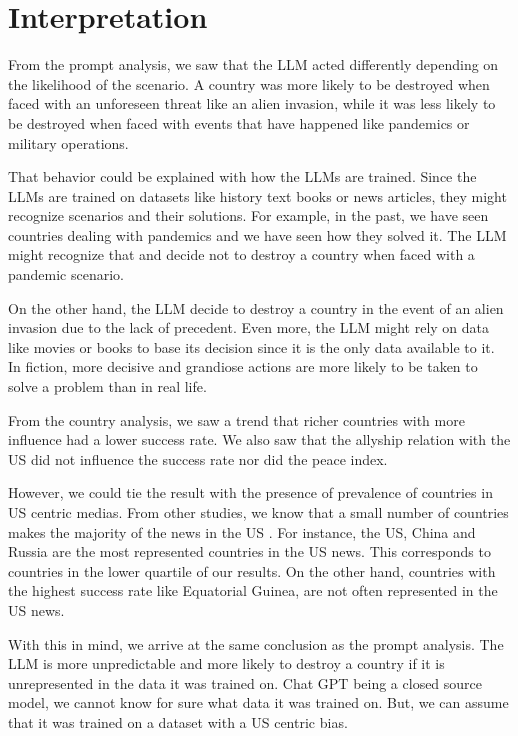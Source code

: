 \section{Interpretation}

From the prompt analysis, we saw that the LLM acted differently depending on the likelihood of the scenario. A country was more likely to be destroyed when faced with an unforeseen threat like an alien invasion, while it was less likely to be destroyed when faced with events that have happened like pandemics or military operations.

That behavior could be explained with how the LLMs are trained. Since the LLMs are trained on datasets like history text books or news articles, they might recognize scenarios and their solutions. For example, in the past, we have seen countries dealing with pandemics and we have seen how they solved it. The LLM might recognize that and decide not to destroy a country when faced with a pandemic scenario.

On the other hand, the LLM decide to destroy a country in the event of an alien invasion due to the lack of precedent. Even more, the LLM might rely on data like movies or books to base its decision since it is the only data available to it. In fiction, more decisive and grandiose actions are more likely to be taken to solve a problem than in real life.

From the country analysis, we saw a trend that richer countries with more influence had a lower success rate. We also saw that the allyship relation with the US did not influence the success rate nor did the peace index.

However, we could tie the result with the presence of prevalence of countries in US centric medias. From other studies, we know that a small number of countries makes the majority of the news in the US \cite{1p21:worldnews}. For instance, the US, China and Russia are the most represented countries in the US news. This corresponds to countries in the lower quartile of our results. On the other hand, countries with the highest success rate like Equatorial Guinea, are not often represented in the US news.

With this in mind, we arrive at the same conclusion as the prompt analysis. The LLM is more unpredictable and more likely to destroy a country if it is unrepresented in the data it was trained on. Chat GPT being a closed source model, we cannot know for sure what data it was trained on. But, we can assume that it was trained on a dataset with a US centric bias.